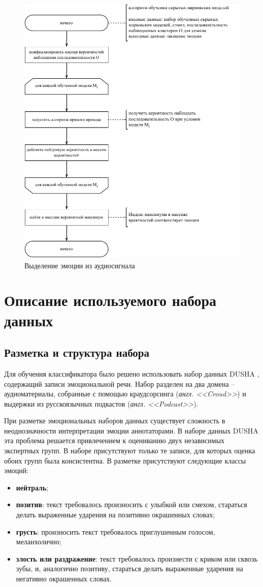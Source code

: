 \begin{figure}[H]
	\centering
	\includegraphics[width=0.8\linewidth]{assets/hmm-test}
	\caption{Выделение эмоции из аудиосигнала}
	\label{fig:hmm-test}
\end{figure}

\section{Описание используемого набора данных}
\subsection{Разметка и структура набора}
Для обучения классификатора было решено использовать набор данных DUSHA \cite{dusha}, содержащий записи эмоциональной речи. Набор разделен на два домена -- аудиоматериалы, собранные с помощью краудсорсинга (\textit{англ. <<Croud>>}) и выдержки из русскоязычных подкастов (\textit{англ. <<Podcast>>}). 

При разметке эмоциональных наборов данных существует сложность в неоднозначности интерпретации эмоции аннотаторами. В наборе данных DUSHA эта проблема решается привлечением к оцениванию двух независимых экспертных групп. В наборе присутствуют только те записи, для которых оценка обоих групп была консистентна. В разметке присутствуют следующие классы эмоций: 
\begin{itemize}
	\item \textbf{нейтраль};
	\item \textbf{позитив}: текст требовалось произносить с улыбкой или смехом, стараться делать выраженные ударения на позитивно окрашенных словах;
	\item \textbf{грусть}: произносить текст требовалось приглушенным голосом, меланхолично;
	\item \textbf{злость или раздражение}: текст требовалось произнести с криком или сквозь зубы, и, аналогично позитиву, стараться делать выраженные ударения на негативно окрашенных словах.
\end{itemize}

